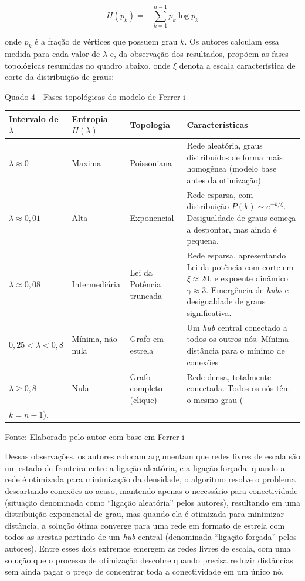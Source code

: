 \documentclass[12pt,oneside,a4paper,brazil,sumario=tradicional]{abntex2}
\begin{document}
\[H(p_{k}) = -\sum_{k=1}^{n-1} p_{k}\log p_{k}\]

onde $p_{k}$ é a fração de vértices que possuem grau $k$. Os autores calculam essa medida para cada valor de $\lambda$ e, da observação dos resultados, propõem as fases topológicas resumidas no quadro abaixo, onde $\xi$ denota a escala característica de corte da distribuição de graus:

Quado 4 - Fases topológicas do modelo de Ferrer i \textcite{ferrericancho2003}

\begin{center}
\begin{tabular}{p{4cm}|p{4cm}|p{4cm}|p{4cm}}
\toprule
\textbf{Intervalo de }$\lambda$ & \textbf{Entropia}$H(\lambda)$ & \textbf{Topologia} & \textbf{Características} \\
\midrule
$\lambda \approx 0$ & Maxima & Poissoniana & Rede aleatória, graus distribuídos de forma mais homogênea (modelo base\textit{ }antes da otimização) \\
$\lambda \approx 0{,}01$ & Alta & Exponencial & Rede esparsa, com distribuição $P(k) \sim e^{-k/\xi}$. Desigualdade de graus começa a despontar, mas ainda é pequena. \\
$\lambda \approx 0{,}08$ & Intermediária & Lei da Potência truncada & Rede esparsa, apresentando Lei da potência com corte em $\xi \approx 20$, e expoente dinâmico $\gamma \approx 3$. Emergência de \textit{hubs} e desigualdade de graus significativa. \\
$0{,}25 < \lambda < 0{,}8$ & Mínima, não nula & Grafo em estrela & Um \textit{hub} central conectado a todos os outros nós. Mínima distância para o mínimo de conexões \\
$\lambda \ge 0{,}8$ & Nula & Grafo completo (clique) & Rede densa, totalmente conectada. Todos os nós têm o mesmo grau (\\$k = n-1$). \\
\bottomrule
\end{tabular}
\end{center}
Fonte: Elaborado pelo autor com base em Ferrer i \textcite{ferrericancho2003}

Dessas observações, os autores colocam argumentam que redes livres de escala são um estado de fronteira entre a ligação aleatória, e a ligação forçada: quando a rede é otimizada para minimização da densidade, o algoritmo resolve o problema descartando conexões ao acaso, mantendo apenas o necessário para conectividade (situação denominada como “ligação aleatória” pelos autores), resultando em uma distribuição exponencial de grau, mas quando ela é otimizada para minimizar distância, a solução ótima converge para uma rede em formato de estrela com todos as arestas partindo de um \textit{hub }central (denominada “ligação forçada” pelos autores). Entre esses dois extremos emergem as redes livres de escala, com uma solução que o processo de otimização descobre quando precisa reduzir distâncias sem ainda pagar o preço de concentrar toda a conectividade em um único nó.
\end{document}
